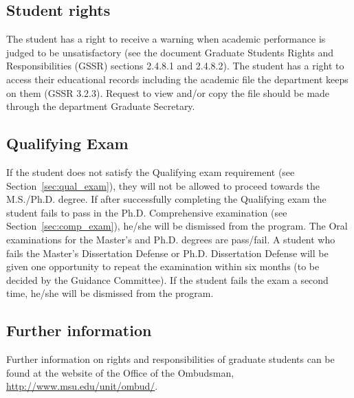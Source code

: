 \subsection{Student rights}

The student has a right to receive a warning when academic performance
is judged to be unsatisfactory (see the document Graduate Students
Rights and Responsibilities (GSSR) sections 2.4.8.1 and 2.4.8.2).  The
student has a right to access their educational records including the
academic file the department keeps on them (GSSR 3.2.3).  Request to
view and/or copy the file should be made through the department
Graduate Secretary.

\subsection{Qualifying Exam}

If the student does not satisfy the Qualifying exam requirement (see
Section~\ref{sec:qual_exam}), they will not be allowed to proceed
towards the M.S./Ph.D. degree.  If after successfully completing the
Qualifying exam the student fails to pass in the Ph.D. Comprehensive
examination (see Section~\ref{sec:comp_exam}), he/she will be
dismissed from the program.  The Oral examinations for the Master's
and Ph.D. degrees are pass/fail.  A student who fails the Master's
Dissertation Defense or Ph.D. Dissertation Defense will be given one
opportunity to repeat the examination within six months (to be decided
by the Guidance Committee).  If the student fails the exam a second
time, he/she will be dismissed from the program.

\subsection{Further information}

Further information on rights and responsibilities of graduate
students can be found at the website of the Office of the Ombudsman,
\url{http://www.msu.edu/unit/ombud/}.

 
